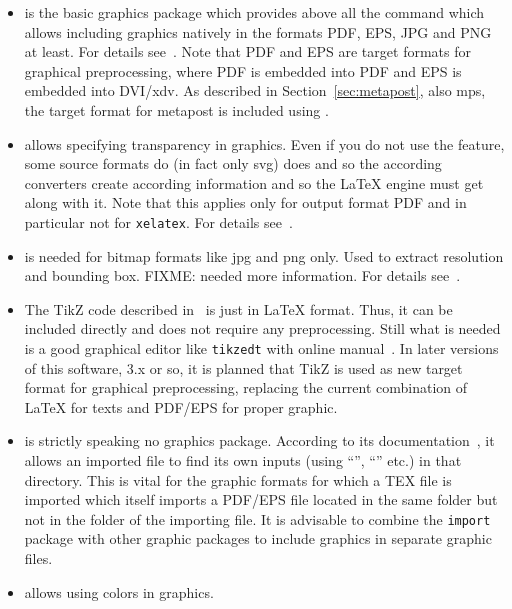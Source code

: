 %
\begin{itemize}
\item[\pkg{graphicx}]
is the basic graphics package which provides above all the 
command  
which allows including graphics natively 
in the formats PDF, EPS, JPG and PNG at least. 
For details see~\cite{GraX}. 
Note that PDF and EPS are target formats for graphical preprocessing, 
where PDF is embedded into PDF and EPS is embedded into DVI/\gls{xdv}\@. 
As described in Section~\ref{sec:metapost}, 
also \gls{mps}, the target format for metapost is included using . 
\item[\pkg{transparent}]
allows specifying transparency in graphics. 
Even if you do not use the feature, 
some source formats do (in fact only \gls{svg}) does 
and so the according converters create according information 
and so the \LaTeX{} engine must get along with it. 
Note that this applies only for output format PDF 
and in particular not for \texttt{xelatex}. 
For details see~\cite{TransP}. 
\item[\pkg{bmpsize}]
is needed for bitmap formats like \gls{jpg} and \gls{png} only. 
Used to extract resolution and bounding box. 
FIXME\@: needed more information. 
For details see~\cite{BmpP}. 
\item[\pkg{tikz}]
The TikZ code described in~\cite{TikzPGF23} is just in \LaTeX{} format. 
Thus, it can be included directly and does not require any preprocessing. 
Still what is needed is a good graphical editor like \texttt{tikzedt} 
with online manual~\cite{TikzEdt}. 
In later versions of this software, 3.x or so, 
it is planned that TikZ is used as new target format for graphical preprocessing, 
replacing the current combination of \LaTeX{} for texts and PDF/EPS for proper graphic. 
\item[\pkg{import}]
is strictly speaking no graphics package. 
According to its documentation~\cite{ImpoP}, 
it allows an imported file to find its own inputs 
(using ``'', ``'' etc.) in that directory. 
This is vital for the graphic formats for which a TEX file is imported 
which itself imports a PDF/EPS file located in the same folder 
but not in the folder of the importing file. 
It is advisable to combine the \texttt{import} package with other graphic packages 
to include graphics in separate graphic files. 
\item[\pkg{xcolor}]
allows using colors in graphics. 

\end{itemize}
